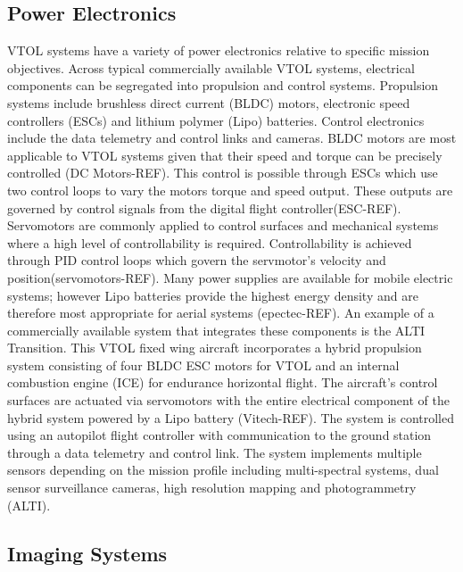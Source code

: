 \subsection{Power Electronics}

VTOL systems have a variety of power electronics relative to specific mission objectives. Across typical commercially available VTOL systems, electrical components can be segregated into propulsion and control systems. Propulsion systems include brushless direct current (BLDC) motors, electronic speed controllers (ESCs) and lithium polymer (Lipo) batteries. Control electronics include the data telemetry and control links and cameras. BLDC motors are most applicable to VTOL systems given that their speed and torque can be precisely controlled (DC Motors-REF). This control is possible through ESCs which use two control loops to vary the motors torque and speed output. These outputs are governed by control signals from the digital flight controller(ESC-REF). Servomotors are commonly applied to control surfaces and mechanical systems where a high level of controllability is required. Controllability is achieved through PID control loops which govern the servmotor's velocity and position(servomotors-REF). Many power supplies are available for mobile electric systems; however Lipo batteries provide the highest energy density and are therefore most appropriate for aerial systems (epectec-REF). An example of a commercially available system that integrates these components is the ALTI Transition. This VTOL fixed wing aircraft incorporates a hybrid propulsion system consisting of four BLDC ESC motors for VTOL and an internal combustion engine (ICE) for endurance horizontal flight. The aircraft's control surfaces are actuated via servomotors with the entire electrical component of the hybrid system powered by a Lipo battery (Vitech-REF). The system is controlled using an autopilot flight controller with communication to the ground station through a data telemetry and control link. The system implements multiple sensors depending on the mission profile including multi-spectral systems, dual sensor surveillance cameras, high resolution mapping and photogrammetry (ALTI). 

\subsection{Imaging Systems}

